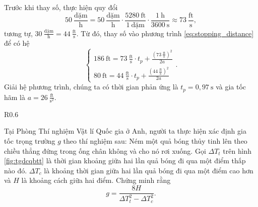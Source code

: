 \documentclass[a4paper, titlepage, openany]{book}
\newcounter{exercise}
\numberwithin{equation}{chapter}
\begin{document}
Trước khi thay số, thực hiện quy đổi $$50\ \frac{\text{dặm}}{\text{h}}=50\ \frac{\text{dặm}}{\text{h}}\cdot\frac{5280\ \text{ft}}{1\ \text{dặm}}\cdot\frac{1\ \text{h}}{3600\ \text{s}}\approx 73\ \frac{\text{ft}}{\text{s}},$$ tương tự, $30\ \frac{\text{dặm}}{\text{h}}=44\ \frac{\text{ft}}{\text{s}}$. Từ đó, thay số vào phương trình \ref{eq:stopping_distance} để có hệ
\begin{equation*}
   \begin{cases}
      186\ \text{ft} = 73\ \frac{\text{ft}}{\text{s}}\cdot t_p + \frac{\left(73\ \frac{\text{ft}}{\text{s}}\right)^2}{2a} \\
      80\ \text{ft} = 44\ \frac{\text{ft}}{\text{s}}\cdot t_p + \frac{\left(44\ \frac{\text{ft}}{\text{s}}\right)^2}{2a} 
   \end{cases}.
\end{equation*}
Giải hệ phương trình, chúng ta có thời gian phản ứng là $t_p=\boxed{0{,}97\ \text{s}}$ và gia tốc hãm là $a = \boxed{26\ \frac{\text{ft}}{\text{s}^2}}$.

\begin{wrapfigure}{R}{0.6\textwidth}
    \centering

   \caption{Đồ thị thời gian - độ cao của quả bóng thủy tinh}
   \label{fig:tgdcqbtt}
\end{wrapfigure}

\exercise Tại Phòng Thí nghiệm Vật lí Quốc gia ở Anh, người ta thực hiện xác định gia tốc trọng trường $g$ theo thí nghiệm sau: Ném một quả bóng thủy tinh lên theo chiều thẳng đứng trong ống chân không và cho nó rơi xuống. Gọi $\Delta T_t$ trên hình \ref{fig:tgdcqbtt} là thời gian khoảng giữa hai lần quả bóng đi qua một điểm thấp nào đó. $\Delta T_c$ là khoảng thời gian giữa hai lần quả bóng đi qua một điểm cao hơn và $H$ là khoảng cách giữa hai điểm. Chứng minh rằng $$g=\frac{8H}{\Delta T_t^2 - \Delta T_c^2}.$$
\end{document}

